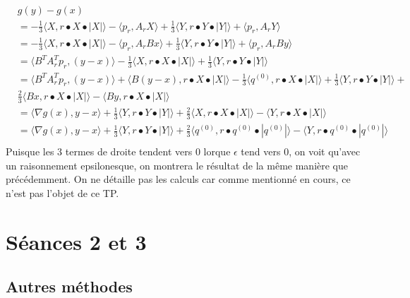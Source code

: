 \documentclass[12pt, letterpaper]{article}
\begin{document}
\begin{align*}
&g(y) - g(x) \\
&= -\frac{1}{3} \langle X,r \bullet X \bullet |X|\rangle  - \langle p_r,A_rX\rangle  + \frac{1}{3}\langle Y,r \bullet Y \bullet |Y|\rangle  + \langle p_r,A_rY\rangle   \\
&= -\frac{1}{3} \langle X,r \bullet X \bullet |X|\rangle  - \langle p_r,A_rBx\rangle  + \frac{1}{3}\langle Y,r \bullet Y \bullet |Y|\rangle  + \langle p_r,A_rBy\rangle   \\
&= \langle B^TA_r^Tp_r,(y - x)\rangle -\frac{1}{3} \langle X,r \bullet X \bullet |X|\rangle + \frac{1}{3}\langle Y,r \bullet Y \bullet |Y|\rangle \\
&= \langle B^TA_r^Tp_r,(y - x)\rangle + \langle B(y-x),r \bullet X \bullet |X|\rangle - \frac{1}{3}\langle q^{(0)},r \bullet X \bullet |X|\rangle + \frac{1}{3}\langle Y,r \bullet Y \bullet |Y|\rangle + \\
&\frac{2}{3} \langle Bx,r \bullet X \bullet |X|\rangle -  \langle By,r \bullet X \bullet |X|\rangle\\
&=  \langle \nabla g(x),y-x\rangle + \frac{1}{3}\langle Y,r \bullet Y \bullet |Y|\rangle + \frac{2}{3} \langle X,r \bullet X \bullet |X|\rangle -  \langle Y,r \bullet X \bullet |X|\rangle \\
&= \langle \nabla g(x),y-x\rangle + \frac{1}{3}\langle Y,r \bullet Y \bullet |Y|\rangle + \frac{2}{3} \langle q^{(0)},r \bullet q^{(0)} \bullet |q^{(0)}|\rangle -  \langle Y,r \bullet q^{(0)} \bullet |q^{(0)}|\rangle \\
\end{align*}
Puisque les 3 termes de droite tendent vers 0 lorque $\epsilon$ tend vers 0, on voit qu'avec un raisonnement epsilonesque, on montrera le résultat de la même manière que précédemment. On ne détaille pas les calculs car comme mentionné en cours, ce n'est pas l'objet de ce TP.

\section*{Séances 2 et 3}

\subsection*{Autres méthodes}
\end{document}
